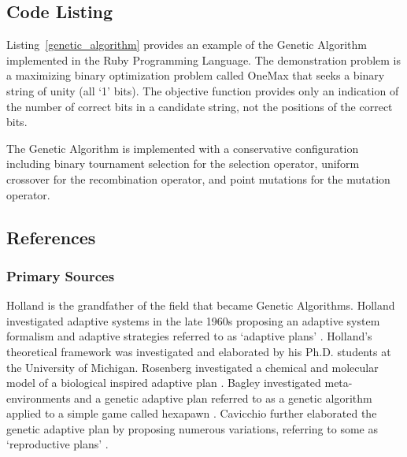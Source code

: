 \subsection{Code Listing}
Listing~\ref{genetic_algorithm} provides an example of the Genetic Algorithm implemented in the Ruby Programming Language. 
The demonstration problem is a maximizing binary optimization problem called OneMax that seeks a binary string of unity (all `1' bits). The objective function provides only an indication of the number of correct bits in a candidate string, not the positions of the correct bits.

The Genetic Algorithm is implemented with a conservative configuration including binary tournament selection for the selection operator, uniform crossover for the recombination operator, and point mutations for the mutation operator.



\subsection{References}
% 
% 
\subsubsection{Primary Sources}
Holland is the grandfather of the field that became Genetic Algorithms. Holland investigated adaptive systems in the late 1960s proposing an adaptive system formalism and adaptive strategies referred to as `adaptive plans' \cite{Holland1962, Holland1962a, Holland1969}. 
Holland's theoretical framework was investigated and elaborated by his Ph.D. students at the University of Michigan. Rosenberg investigated a chemical and molecular model of a biological inspired adaptive plan \cite{Rosenberg1967}. Bagley investigated meta-environments and a genetic adaptive plan referred to as a genetic algorithm applied to a simple game called hexapawn \cite{Bagley1967}. Cavicchio further elaborated the genetic adaptive plan by proposing numerous variations, referring to some as `reproductive plans' \cite{Cavicchio1970}. 

